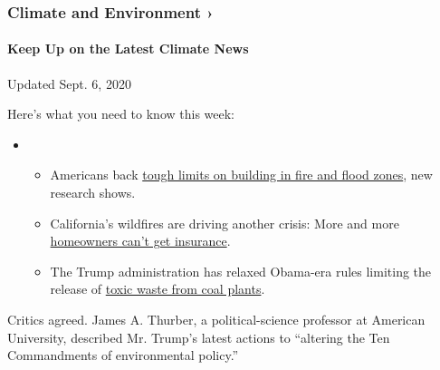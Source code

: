 \href{\%3Ca\%20href=\%22https://www.nytimes3xbfgragh.onion/section/climate?action=click\&pgtype=Article\&state=default\&region=MAIN_CONTENT_1\&context=storylines_keepup\%22\%3Ehttps://www.nytimes3xbfgragh.onion/section/climate?action=click\&pgtype=Article\&state=default\&region=MAIN_CONTENT_1\&context=storylines_keepup\%3C/a\%3E}{}

\hypertarget{climate-and-environment-}{%
\subsubsection{Climate and Environment
›}\label{climate-and-environment-}}

\hypertarget{keep-up-on-the-latest-climate-news}{%
\paragraph{Keep Up on the Latest Climate
News}\label{keep-up-on-the-latest-climate-news}}

Updated Sept. 6, 2020

Here's what you need to know this week:

\begin{itemize}
\item
  \begin{itemize}
  \tightlist
  \item
    Americans back
    \href{https://www.nytimes3xbfgragh.onion/2020/09/04/climate/flood-fire-building-restrictions.html?action=click\&pgtype=Article\&state=default\&region=MAIN_CONTENT_1\&context=storylines_keepup}{tough
    limits on building in fire and flood zones}, new research shows.
  \item
    California's wildfires are driving another crisis: More and more
    \href{https://www.nytimes3xbfgragh.onion/2020/09/02/climate/wildfires-insurance.html?action=click\&pgtype=Article\&state=default\&region=MAIN_CONTENT_1\&context=storylines_keepup}{homeowners
    can't get insurance}.
  \item
    The Trump administration has relaxed Obama-era rules limiting the
    release of
    \href{https://www.nytimes3xbfgragh.onion/2020/08/31/climate/trump-coal-plants.html?action=click\&pgtype=Article\&state=default\&region=MAIN_CONTENT_1\&context=storylines_keepup}{toxic
    waste from coal plants}.
  \end{itemize}
\end{itemize}

Critics agreed. James A. Thurber, a political-science professor at
American University, described Mr. Trump's latest actions to ``altering
the Ten Commandments of environmental policy.''

